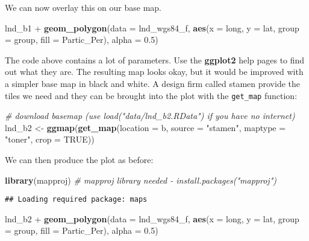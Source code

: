 \documentclass[]{article}
\newenvironment{Shaded}{}{}
\newcommand{\KeywordTok}[1]{\textcolor[rgb]{0.00,0.44,0.13}{\textbf{{#1}}}}
\newcommand{\DataTypeTok}[1]{\textcolor[rgb]{0.56,0.13,0.00}{{#1}}}
\newcommand{\FloatTok}[1]{\textcolor[rgb]{0.25,0.63,0.44}{{#1}}}
\newcommand{\StringTok}[1]{\textcolor[rgb]{0.25,0.44,0.63}{{#1}}}
\newcommand{\CommentTok}[1]{\textcolor[rgb]{0.38,0.63,0.69}{\textit{{#1}}}}
\newcommand{\OtherTok}[1]{\textcolor[rgb]{0.00,0.44,0.13}{{#1}}}
\newcommand{\NormalTok}[1]{{#1}}
\begin{document}
We can now overlay this on our base map.

\begin{Shaded}
\begin{Highlighting}[]
\NormalTok{lnd_b1 +}
\StringTok{  }\KeywordTok{geom_polygon}\NormalTok{(}\DataTypeTok{data =} \NormalTok{lnd_wgs84_f,}
               \KeywordTok{aes}\NormalTok{(}\DataTypeTok{x =} \NormalTok{long, }\DataTypeTok{y =} \NormalTok{lat, }\DataTypeTok{group =} \NormalTok{group, }\DataTypeTok{fill =} \NormalTok{Partic_Per),}
               \DataTypeTok{alpha =} \FloatTok{0.5}\NormalTok{)}
\end{Highlighting}
\end{Shaded}

The code above contains a lot of parameters. Use the \textbf{ggplot2}
help pages to find out what they are. The resulting map looks okay, but
it would be improved with a simpler base map in black and white. A
design firm called stamen provide the tiles we need and they can be
brought into the plot with the \texttt{get\_map} function:

\begin{Shaded}
\begin{Highlighting}[]
\CommentTok{# download basemap (use load("data/lnd_b2.RData") if you have no internet)}
\NormalTok{lnd_b2 <-}\StringTok{ }\KeywordTok{ggmap}\NormalTok{(}\KeywordTok{get_map}\NormalTok{(}\DataTypeTok{location =} \NormalTok{b, }\DataTypeTok{source =} \StringTok{"stamen"}\NormalTok{,}
          \DataTypeTok{maptype =} \StringTok{"toner"}\NormalTok{, }\DataTypeTok{crop =} \OtherTok{TRUE}\NormalTok{))}
\end{Highlighting}
\end{Shaded}

We can then produce the plot as before:

\begin{Shaded}
\begin{Highlighting}[]
\KeywordTok{library}\NormalTok{(mapproj) }\CommentTok{# mapproj library needed - install.packages("mapproj")}
\end{Highlighting}
\end{Shaded}

\begin{verbatim}
## Loading required package: maps
\end{verbatim}

\begin{Shaded}
\begin{Highlighting}[]
\NormalTok{lnd_b2 +}
\StringTok{  }\KeywordTok{geom_polygon}\NormalTok{(}\DataTypeTok{data =} \NormalTok{lnd_wgs84_f,}
               \KeywordTok{aes}\NormalTok{(}\DataTypeTok{x =} \NormalTok{long, }\DataTypeTok{y =} \NormalTok{lat, }\DataTypeTok{group =} \NormalTok{group, }\DataTypeTok{fill =} \NormalTok{Partic_Per),}
               \DataTypeTok{alpha =} \FloatTok{0.5}\NormalTok{)}
\end{Highlighting}
\end{Shaded}
\end{document}
